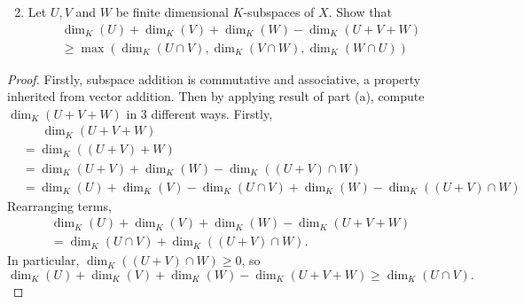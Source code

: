 \documentclass[11pt]{article}
\theoremstyle{definition}
\numberwithin{lemma}{problem}
\numberwithin{equation}{problem}
\renewcommand{\geq}{\geqslant}
\begin{document}
\newpage
\begin{enumerate}[label=(\alph*)] \setcounter{enumi}{1}
    \item Let $U, V$ and $W$ be finite dimensional $K$-subspaces of $X$. Show that
        \begin{align*}
            \dim_K(U) + \dim_K(V) + \dim_K(W) - \dim_K(U + V + W)   \\
            \geq \max\left(
                \dim_K(U\cap V), \dim_K(V\cap W), \dim_K(W\cap U)
            \right)
        \end{align*}
\end{enumerate}
\begin{proof}
    Firstly, subspace addition is commutative and associative, a property inherited from vector addition.
    Then by applying result of part (a), compute $\dim_K(U+V+W)$ in 3 different ways.
    Firstly,
    \begin{align*}
        &\phantom{=\ }\dim_K(U+V+W)   \\
        &= \dim_K((U+V)+W)    \\
        &= \dim_K(U+V) + \dim_K(W) -\dim_K((U+V)\cap W) \\
        &= \dim_K(U) + \dim_K(V) - \dim_K(U\cap V)
            + \dim_K(W) -\dim_K((U+V)\cap W)
    \end{align*}
    Rearranging terms,
    \begin{multline*}
        \dim_K(U) + \dim_K(V) + \dim_K(W) - \dim_K(U+V+W) \\ =
        \dim_K(U\cap V) + \dim_K((U+V)\cap W).
    \end{multline*}
    In particular, $\dim_K((U+V)\cap W) \geq 0$, so
    \begin{equation}    \label{q4b_1st}
        \dim_K(U) + \dim_K(V) + \dim_K(W) - \dim_K(U+V+W) \geq \dim_K(U\cap V).
    \end{equation}


\end{proof}
\end{document}
